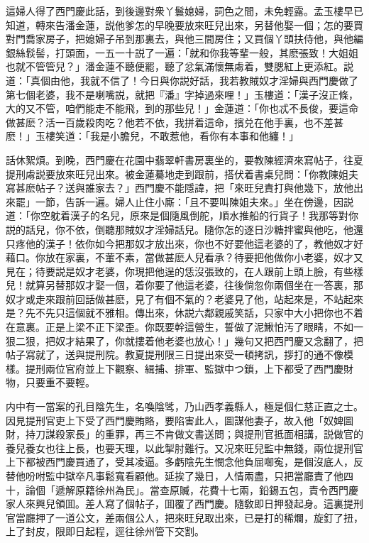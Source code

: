 這婦人得了西門慶此話，到後邊對衆丫鬟媳婦，詞色之間，未免輕露。孟玉樓早已知道，轉來告潘金蓮，説他爹怎的早晚要放來旺兒出來，另替他娶一個；怎的要買對門喬家房子，把媳婦子吊到那裏去，與他三間房住；又買個丫頭扶侍他，與他編銀絲䯼髻，打頭面，一五一十説了一遍：「就和你我等輩一般，其麽張致！大姐姐也就不管管兒？」潘金蓮不聽便罷，聽了忿氣滿懷無䖏着，雙腮紅上更添紅。説道：「真個由他，我就不信了！今日與你説好話，我若教賊奴才淫婦與西門慶做了第七個老婆，我不是喇嘴説，就把『潘』字掉過來哩！」玉樓道：「漢子沒正條，大的又不管，咱們能走不能飛，到的那些兒！」金蓮道：「你也忒不長俊，要這命做甚麽？活一百歲殺肉吃？他若不依，我拼着這命，擯兑在他手裏，也不差甚麽！」玉樓笑道：「我是小膽兒，不敢惹他，看你有本事和他纏！」

話休絮煩。到晚，西門慶在花園中翡翠軒書房裏坐的，要教陳經濟來寫帖子，往夏提刑䖏説要放來旺兒出來。被金蓮驀地走到跟前，搭伏着書桌兒問：「你教陳姐夫寫甚麽帖子？送與誰家去？」西門慶不能隱諱，把「來旺兒責打與他幾下，放他出來罷」一節，告訴一遍。婦人止住小廝：「且不要叫陳姐夫來。」坐在傍邊，因説道：「你空躭着漢子的名兒，原來是個隨風倒舵，順水推船的行貨子！我那等對你説的話兒，你不依，倒聽那賊奴才淫婦話兒。隨你怎的逐日沙糖拌蜜與他吃，他還只疼他的漢子！依你如今把那奴才放出來，你也不好要他這老婆的了，教他奴才好藉口。你放在家裏，不葷不素，當做甚麽人兒看承？待要把他做你小老婆，奴才又見在；待要説是奴才老婆，你現把他逞的恁沒張致的，在人跟前上頭上臉，有些樣兒！就算另替那奴才娶一個，着你要了他這老婆，往後倘忽你兩個坐在一答裏，那奴才或走來跟前回話做甚麽，見了有個不氣的？老婆見了他，站起來是，不站起來是？先不先只這個就不雅相。傳出來，休説六鄰親戚笑話，只家中大小把你也不着在意裏。正是上梁不正下梁歪。你既要幹這營生，誓做了泥鰍怕汚了眼睛，不如一狠二狠，把奴才結果了，你就摟着他老婆也放心！」幾句又把西門慶又念翻了，把帖子寫就了，送與提刑院。教夏提刑限三日提出來受一頓拷訊，拶打的通不像模樣。提刑兩位官府並上下觀察、緝捕、排軍、監獄中つ鎖，上下都受了西門慶財物，只要重不要輕。

内中有一當案的孔目陰先生，名喚陰骘，乃山西孝義縣人，極是個仁慈正直之士。因見提刑官吏上下受了西門慶賄賂，要陷害此人，圖謀他妻子，故入他「奴婢圖財，持刀謀殺家長」的重罪，再三不肯做文書送問；與提刑官抵面相講，説做官的養兒養女也往上長，也要天理，以此掣肘難行。又况來旺兒監中無錢，兩位提刑官上下都被西門慶買通了，受其凌逼。多虧陰先生憫念他負屈啣寃，是個沒底人，反替他吩咐監中獄卒凡事鬆寬看顧他。延挨了幾日，人情兩盡，只把當廳責了他四十，論個「遞解原籍徐州為民」。當查原贓，花費十七兩，鉛錫五包，責令西門慶家人來興兒領囬。差人寫了個帖子，囬覆了西門慶。隨敎即日押發起身。這裏提刑官當廳押了一道公文，差兩個公人，把來旺兒取出來，已是打的稀爛，旋釘了扭，上了封皮，限即日起程，逕往徐州管下交割。


